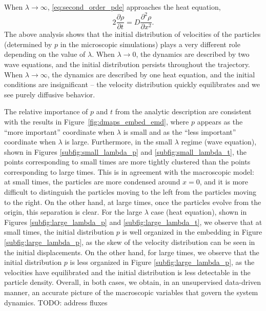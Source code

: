 \documentclass[preprint]{elsarticle}
\begin{document}
When $\lambda \rightarrow \infty$, \eqref{eq:second_order_pde} approaches the heat equation,
\begin{equation}
2 \frac{\partial \rho}{\partial t} = D \frac{\partial ^2 \rho}{\partial x^2}.
\end{equation}
%
%
The above analysis shows that the initial distribution of velocities of the particles (determined by $p$ in the microscopic simulations) plays a very different role depending on the value of $\lambda$.
%
When $\lambda \rightarrow 0$, the dynamics are described by two wave equations, and the initial distribution persists throughout the trajectory.
%
When $\lambda \rightarrow \infty$, the dynamics are described by one heat equation, and the initial conditions are insignificant -- the velocity distribution quickly equilibrates and we see purely diffusive behavior.
%

The relative importance of $p$ and $t$ from the analytic description are consistent with the results in Figure~\ref{fig:dmaps_embed_emd}, where $p$ appears as the ``more important'' coordinate when $\lambda$ is small and as the ``less important'' coordinate when $\lambda$ is large. 
%
Furthermore, in the small $\lambda$ regime (wave equation), shown in Figures \ref{subfig:small_lambda_p} and \ref{subfig:small_lambda_t}, the points corresponding to small times are more tightly clustered than the points corresponding to large times.
%
This is in agreement with the macroscopic model: at small times, the particles are more condensed around $x=0$, and it is more difficult to distinguish the particles moving to the left from the particles moving to the right. 
%
On the other hand, at large times, once the particles evolve from the origin, this separation is clear.  
%
For the large $\lambda$ case (heat equation), shown in Figures \ref{subfig:large_lambda_p} and \ref{subfig:large_lambda_t}, we observe that at small times, the initial distribution $p$ is well organized in the embedding in Figure \ref{subfig:large_lambda_p}, as the skew of the velocity distribution can be seen in the initial displacements.
%
On the other hand, for large times, we observe that the initial distribution $p$ is less organized in Figure \ref{subfig:large_lambda_p}, as the velocities have equilibrated and the initial distribution is less detectable in the particle density.
%
Overall, in both cases, we obtain, in an unsupervised data-driven manner, an accurate picture of the macroscopic variables that govern the system dynamics.
%
TODO: address fluxes
\end{document}
